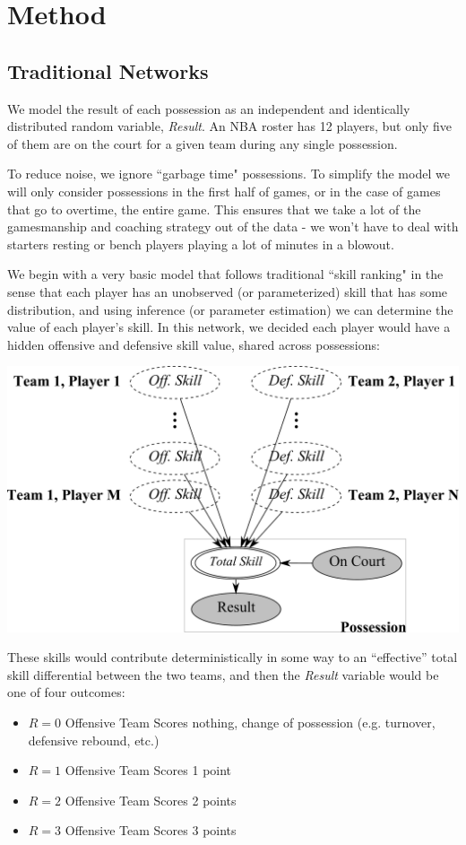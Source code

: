 \documentclass[10pt,twocolumn]{article}
\begin{document}

\section{Method}
\subsection{Traditional Networks}

We model the result of each possession as an independent and identically distributed random variable, \emph{Result}.
An NBA roster has 12 players, but only five of them are on the court for a given team during any single possession.

To reduce noise, we ignore ``garbage time" possessions. To simplify the model we will only consider possessions in the first half of games, or in the case of games that go to overtime, the entire game. This ensures that we take a lot of the gamesmanship and coaching strategy out of the data - we won't have to deal with starters resting or bench players playing a lot of minutes in a blowout.

We begin with a very basic model that follows traditional ``skill ranking" in the sense that each player has an unobserved (or parameterized) skill that has some distribution, and using inference (or parameter estimation) we can determine the value of each player's skill.
In this network, we decided each player would have a hidden offensive and defensive skill value, shared across possessions:
\begin{center}
	\includegraphics[width=0.90\linewidth]{figures/network}
\end{center}
These skills would contribute deterministically in some way to an ``effective'' total skill differential between the two teams, and then the \emph{Result} variable would be one of four outcomes:
\begin{itemize}
\item $R=0$ Offensive Team Scores nothing, change of possession (e.g. turnover, defensive rebound, etc.)
\item $R=1$ Offensive Team Scores 1 point
\item $R=2$ Offensive Team Scores 2 points
\item $R=3$ Offensive Team Scores 3 points
\end{itemize}
\end{document}
